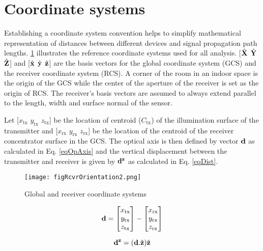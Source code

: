\section{Coordinate systems}
\label{sec:coordinate}
\graphicspath{{_SISO/Figures/}}

Establishing a coordinate system convention helps to simplify mathematical representation of distances between different devices and signal propagation path lengths. \figurename{ \ref{fig:RcvrCoord}} illustrates the reference coordinate systems used for all analysis. [$\hat{\bf{X}}$ $\hat{\bf{Y}}$ $\hat{\bf{Z}}$] and [$\hat{\bf{x}}$ $\hat{\bf{y}}$ $\hat{\bf{z}}$] are the basis vectors for the global coordinate system (GCS) and the receiver coordinate system (RCS). A corner of the room in an indoor space is the origin of the GCS while the center of the aperture of the receiver is set as the origin of RCS. The receiver's basis vectors are assumed to always extend parallel to the length, width and surface normal of the sensor. 

Let [$x_{\text{tx}}$ $y_{\text{tx}}$ $z_{\text{tx}}$] be the location of centroid ($C_{\text{tx}}$) of the illumination surface of the transmitter and [$x_{\text{rx}}$ $y_{\text{rx}}$ $z_{\text{rx}}$] be the location of the centroid of the receiver concentrator surface in the GCS. The optical axis is then defined by vector ${\bf{d}}$ as calculated in Eq. \eqref{eqOpAxis} and the vertical displacement between the transmitter and receiver is given by ${\bf{d}^{z}}$ as calculated in Eq. \eqref{eqDist}.

\begin{figure}[!t]
	\centering
		\texttt{[image: figRcvrOrientation2.png]}
	\caption{Global and receiver coordinate systems}
	\label{fig:RcvrCoord}
\end{figure}

\begin{equation}
\label{eqOpAxis}
	{\bf{d}}=\left[ \begin{matrix} x_{\text{tx}}\\ y_{\text{tx}}\\ z_{\text{tx}} \end{matrix} \right] - \left[ \begin{matrix} x_{\text{rx}}\\ y_{\text{rx}}\\ z_{\text{rx}} \end{matrix} \right]
\end{equation}

\begin{equation}
\label{eqDist}
	{\bf{d}^{z}}=({\bf{d}}.{\hat{\bf{z}}}){\hat{\bf{z}}}
\end{equation}

